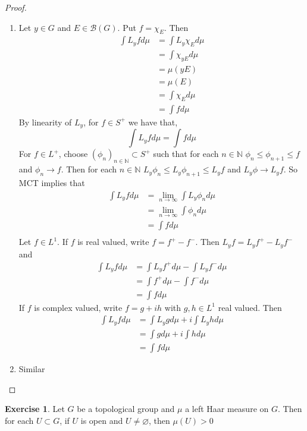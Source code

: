 \documentclass[12pt]{amsart}
\theoremstyle{definition}
\newtheorem{ex}[definition]{Exercise}
\newcommand{\N}{\mathbb{N}}
\newcommand{\MB}{\mathcal{B}}
\newcommand{\limn}{\lim \limits_{n \rightarrow \infty}}
\newcommand{\seq}[2]{(#1_{#2})_{#2 \in \N}}
\newcommand{\lex}[1]{\label{ex:#1}}
\begin{document}
	\begin{proof}\
		\begin{enumerate}
			\item Let $y \in G$ and $E \in \MB(G)$. Put $f = \chi_E$. Then 
			\begin{align*}
				\int L_y f d \mu 
				& = \int L_y\chi_E d \mu \\
				& =  \int \chi_{yE} d\mu \\
				& = \mu(yE) \\
				& = \mu(E) \\
				& = \int \chi_E d\mu \\
				& = \int f d \mu
			\end{align*} 
			By linearity of $L_y$, for $f \in S^+$ we have that, $$\int L_y f d \mu = \int f d \mu$$ For $f \in L^+$, choose $\seq{\phi}{n} \subset S^+$ such that for each $n \in \N$ $\phi_n \leq \phi_{n+1} \leq f$ and $\phi_n \rightarrow f$. Then for each $n \in \N$ $L_y \phi_n \leq L_y \phi_{n+1} \leq L_y f$ and $L_y \phi \rightarrow L_y f$. So MCT implies that 
			\begin{align*}
				\int L_y f d \mu 
				& = \limn \int L_y \phi_n d \mu \\
				& = \limn \int \phi_n d \mu \\
				& = \int f d \mu \\
			\end{align*}
			Let $f \in L^1$. If $f$ is real valued, write $f = f^+ - f^-$. Then $L_y f = L_y f^+ - L_y f^-$ and 
			\begin{align*}
				\int L_yf d \mu 
				& = \int L_y f^+ d \mu - \int L_y f^- d \mu \\
				& = \int f^+ d \mu - \int f^- d \mu \\
				& = \int f d \mu
			\end{align*}
			If $f$ is complex valued, write $f = g + ih$ with $g, h \in L^1$ real valued. Then 
			\begin{align*}
				\int L_yf d \mu 
				& = \int L_y g d \mu + i \int L_y h d \mu \\
				& = \int g d \mu +i \int h d \mu \\
				& = \int f d \mu
			\end{align*}
			\item Similar
		\end{enumerate}
	\end{proof}
	
	\begin{ex} \lex{00000} 
		Let $G$ be a topological group and $\mu$ a left Haar measure on $G$. Then for each $U \subset G$, if $U$ is open and $U \neq \varnothing$, then $\mu(U) > 0$
	\end{ex}
\end{document}

